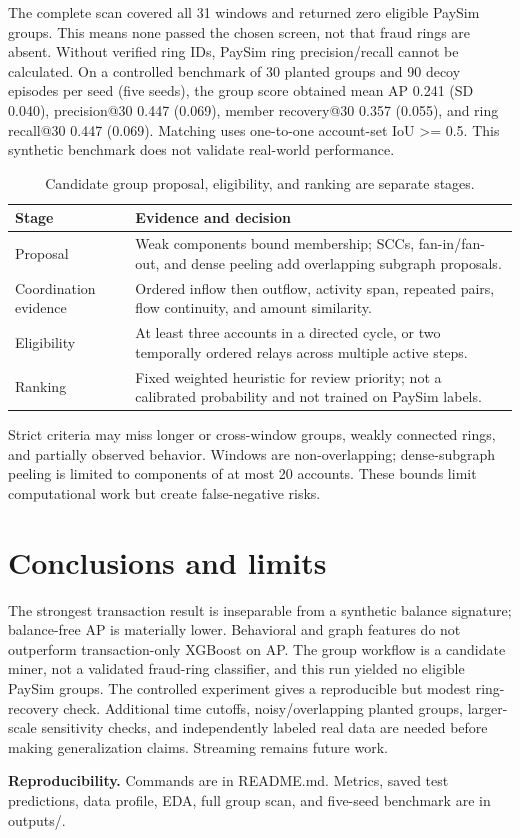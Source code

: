 \documentclass[11pt]{article}
\begin{document}
The complete scan covered all 31 windows and returned zero eligible PaySim groups. This means none passed the chosen screen, not that fraud rings are absent. Without verified ring IDs, PaySim ring precision/recall cannot be calculated. On a controlled benchmark of 30 planted groups and 90 decoy episodes per seed (five seeds), the group score obtained mean AP 0.241 (SD 0.040), precision@30 0.447 (0.069), member recovery@30 0.357 (0.055), and ring recall@30 0.447 (0.069). Matching uses one-to-one account-set IoU >= 0.5. This synthetic benchmark does not validate real-world performance.
\begin{table}[h]\centering\small\begin{tabularx}{\linewidth}{p{1.35in}X}\toprule Stage & Evidence and decision\\\midrule
Proposal & Weak components bound membership; SCCs, fan-in/fan-out, and dense peeling add overlapping subgraph proposals.\\
Coordination evidence & Ordered inflow then outflow, activity span, repeated pairs, flow continuity, and amount similarity.\\
Eligibility & At least three accounts in a directed cycle, or two temporally ordered relays across multiple active steps.\\
Ranking & Fixed weighted heuristic for review priority; not a calibrated probability and not trained on PaySim labels.\\\bottomrule\end{tabularx}\caption{Candidate group proposal, eligibility, and ranking are separate stages.}\end{table}
Strict criteria may miss longer or cross-window groups, weakly connected rings, and partially observed behavior. Windows are non-overlapping; dense-subgraph peeling is limited to components of at most 20 accounts. These bounds limit computational work but create false-negative risks.
\section*{Conclusions and limits}
The strongest transaction result is inseparable from a synthetic balance signature; balance-free AP is materially lower. Behavioral and graph features do not outperform transaction-only XGBoost on AP. The group workflow is a candidate miner, not a validated fraud-ring classifier, and this run yielded no eligible PaySim groups. The controlled experiment gives a reproducible but modest ring-recovery check. Additional time cutoffs, noisy/overlapping planted groups, larger-scale sensitivity checks, and independently labeled real data are needed before making generalization claims. Streaming remains future work.

\textbf{Reproducibility.} Commands are in README.md. Metrics, saved test predictions, data profile, EDA, full group scan, and five-seed benchmark are in outputs/.
\end{document}
